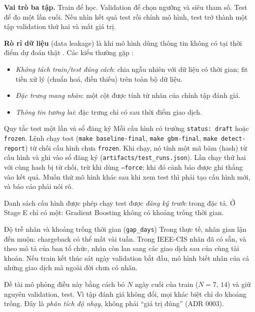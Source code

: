 \documentclass[11pt,a4paper]{article}
\newcommand{\code}[1]{\texttt{\small #1}}
\begin{document}
\textbf{Vai trò ba tập.} Train để học. Validation để chọn ngưỡng và siêu tham số. Test để đo một lần cuối. Nếu nhìn kết quả test rồi chỉnh mô hình, test trở thành một tập validation thứ hai và mất giá trị.

\textbf{Rò rỉ dữ liệu} (data leakage) là khi mô hình dùng thông tin không có tại thời điểm dự đoán thật \cite{kaufman}. Các kiểu thường gặp \cite{kapoor}:
\begin{itemize}
  \item \emph{Không tách train/test đúng cách}: chia ngẫu nhiên với dữ liệu có thời gian; fit tiền xử lý (chuẩn hoá, điền thiếu) trên toàn bộ dữ liệu.
  \item \emph{Đặc trưng mang nhãn}: một cột được tính từ nhãn của chính tập đánh giá.
  \item \emph{Thông tin tương lai}: đặc trưng chỉ có sau thời điểm giao dịch.
\end{itemize}

\begin{explain}{Quy tắc test một lần và sổ đăng ký}
Mỗi cấu hình có trường \code{status: draft} hoặc \code{frozen}. Lệnh chạy test (\code{make baseline-final}, \code{make gbm-final}, \code{make detect-report}) từ chối cấu hình chưa \code{frozen}. Khi chạy, nó tính một mã băm (hash) từ cấu hình và ghi vào sổ đăng ký (\code{artifacts/test\_runs.json}). Lần chạy thứ hai với cùng hash bị từ chối, trừ khi dùng \code{--force}; khi đó cảnh báo được ghi thẳng vào kết quả. Muốn thử mô hình khác sau khi xem test thì phải tạo cấu hình mới, và báo cáo phải nói rõ.

Danh sách cấu hình được phép chạy test được \emph{đăng ký trước} trong đặc tả. Ở Stage E chỉ có một: Gradient Boosting không có khoảng trống thời gian.
\end{explain}

\begin{explain}{Độ trễ nhãn và khoảng trống thời gian (\code{gap\_days})}
Trong thực tế, nhãn gian lận đến muộn: chargeback có thể mất vài tuần. Trong IEEE-CIS nhãn đã có sẵn, và theo mô tả của ban tổ chức, nhãn còn lan sang các giao dịch sau của cùng tài khoản. Nếu train kết thúc sát ngày validation bắt đầu, mô hình biết nhãn của cả những giao dịch mà ngoài đời chưa có nhãn.

Đề tài mô phỏng điều này bằng cách bỏ $N$ ngày cuối của train ($N=7$, $14$) và giữ nguyên validation, test. Vì tập đánh giá không đổi, mọi khác biệt chỉ do khoảng trống. Đây là \emph{phân tích độ nhạy}, không phải ``giá trị đúng'' (ADR 0003).
\end{explain}
\end{document}
